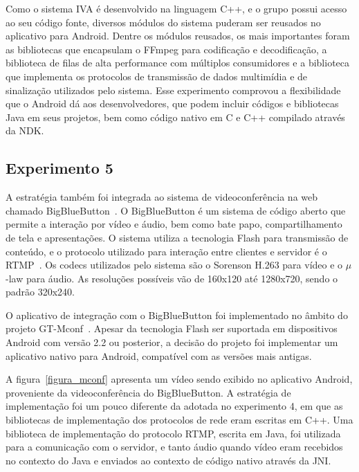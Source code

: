 \documentclass{acm_proc_article-sp}
\begin{document}
Como o sistema IVA é desenvolvido na linguagem C++, e o grupo possui acesso ao seu código fonte, diversos módulos do sistema puderam ser reusados no aplicativo para Android. Dentre os módulos reusados, os mais importantes foram as bibliotecas que encapsulam o FFmpeg para codificação e decodificação, a biblioteca de filas de alta performance com múltiplos consumidores e a biblioteca que implementa os protocolos de transmissão de dados multimídia e de sinalização utilizados pelo sistema. Esse experimento comprovou a flexibilidade que o Android dá aos desenvolvedores, que podem incluir códigos e bibliotecas Java em seus projetos, bem como código nativo em C e C++ compilado através da NDK.

\subsection{Experimento 5}
A estratégia também foi integrada ao sistema de videoconferência na web chamado BigBlueButton~\cite{bbb}. O BigBlueButton é um sistema de código aberto que permite a interação por vídeo e áudio, bem como bate papo, compartilhamento de tela e apresentações. O sistema utiliza a tecnologia Flash para transmissão de conteúdo, e o protocolo utilizado para interação entre clientes e servidor é o RTMP~\cite{rtmp}. Os codecs utilizados pelo sistema são o Sorenson H.263 para vídeo e o $\mu$-law para áudio. As resoluções possíveis vão de 160x120 até 1280x720, sendo o padrão 320x240.

O aplicativo de integração com o BigBlueButton foi implementado no âmbito do projeto GT-Mconf~\cite{mconf}. Apesar da tecnologia Flash ser suportada em dispositivos Android com versão 2.2 ou posterior, a decisão do projeto foi implementar um aplicativo nativo para Android, compatível com as versões mais antigas.

A figura~\ref{figura_mconf} apresenta um vídeo sendo exibido no aplicativo Android, proveniente da videoconferência do BigBlueButton. A estratégia de implementação foi um pouco diferente da adotada no experimento 4, em que as bibliotecas de implementação dos protocolos de rede eram escritas em C++. Uma biblioteca de implementação do protocolo RTMP, escrita em Java, foi utilizada para a comunicação com o servidor, e tanto áudio quando vídeo eram recebidos no contexto do Java e enviados ao contexto de código nativo através da JNI.
\end{document}

